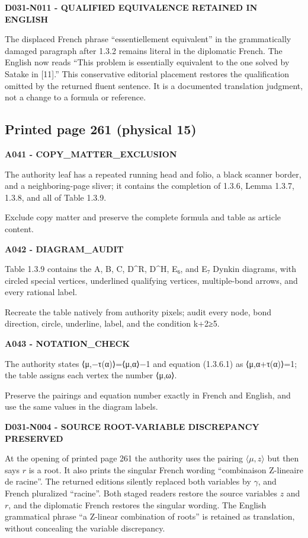 \documentclass[10pt,a4paper]{article}
\begin{document}
\textbf{D031-N011 - QUALIFIED EQUIVALENCE RETAINED IN ENGLISH}

The displaced French phrase ``essentiellement equivalent'' in the grammatically damaged paragraph after 1.3.2 remains literal in the diplomatic French. The English now reads ``This problem is essentially equivalent to the one solved by Satake in {[}11{]}.'' This conservative editorial placement restores the qualification omitted by the returned fluent sentence. It is a documented translation judgment, not a change to a formula or reference.

\subsection{Printed page 261 (physical 15)}

\textbf{A041 - COPY\_MATTER\_EXCLUSION}

The authority leaf has a repeated running head and folio, a black scanner border, and a neighboring-page sliver; it contains the completion of 1.3.6, Lemma 1.3.7, 1.3.8, and all of Table 1.3.9.

Exclude copy matter and preserve the complete formula and table as article content.

\textbf{A042 - DIAGRAM\_AUDIT}

Table 1.3.9 contains the A, B, C, D\^{}R, D\^{}H, E₆, and E₇ Dynkin diagrams, with circled special vertices, underlined qualifying vertices, multiple-bond arrows, and every rational label.

Recreate the table natively from authority pixels; audit every node, bond direction, circle, underline, label, and the condition k+2≥5.

\textbf{A043 - NOTATION\_CHECK}

The authority states ⟨μ,−τ(α)⟩=⟨μ,α⟩−1 and equation (1.3.6.1) as ⟨μ,α+τ(α)⟩=1; the table assigns each vertex the number ⟨μ,ω⟩.

Preserve the pairings and equation number exactly in French and English, and use the same values in the diagram labels.

\textbf{D031-N004 - SOURCE ROOT-VARIABLE DISCREPANCY PRESERVED}

At the opening of printed page 261 the authority uses the pairing \(\langle\mu,z\rangle\) but then says \(r\) is a root. It also prints the singular French wording ``combinaison Z-lineaire de racine''. The returned editions silently replaced both variables by \(\gamma\), and French pluralized ``racine''. Both staged readers restore the source variables \(z\) and \(r\), and the diplomatic French restores the singular wording. The English grammatical phrase ``a Z-linear combination of roots'' is retained as translation, without concealing the variable discrepancy.
\end{document}
